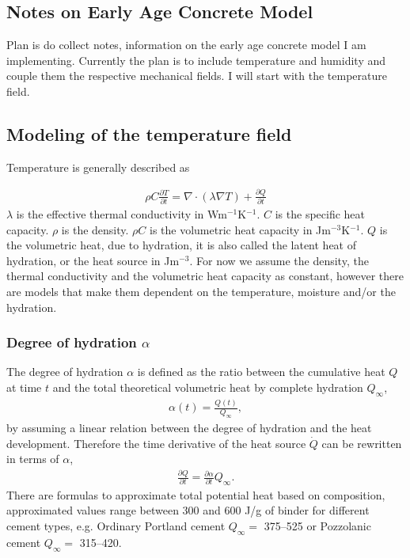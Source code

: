 
\subsection{Notes on Early Age Concrete Model}
Plan is do collect notes, information on the early age concrete model I am implementing.
Currently the plan is to include temperature and humidity and couple them the respective mechanical fields.
I will start with the temperature field.

\subsection{Modeling of the temperature field}
Temperature is generally described as

\begin{align}
	\rho C\frac{\partial T}{\partial t} = \nabla \cdot (\lambda \nabla T) + \frac{\partial Q}{\partial t} \label{eq:heat1}
\end{align}
$\lambda$ is the effective thermal conductivity in Wm$^{-1}$K$^{-1}$.
$C$ is the specific heat capacity.
$\rho$ is the density.
$\rho C$ is the volumetric heat capacity in Jm$^{-3}$K$^{-1}$.
$Q$ is the volumetric heat, due to hydration, it is also called the latent heat of hydration, or the heat source in Jm$^{-3}$.
For now we assume the density, the thermal conductivity and the volumetric heat capacity as constant, however there are models that make them dependent on the temperature, moisture and/or the hydration.


\subsubsection{Degree of hydration $\alpha$}
The degree of hydration $\alpha$ is defined as the ratio between the cumulative heat $Q$ at time $t$ and the total theoretical volumetric heat by complete hydration $Q_{\infty}$,
\begin{align}
	\alpha(t) = \frac{Q(t)}{Q_{\infty}},
\end{align}
by assuming a linear relation between the degree of hydration and the heat development.
Therefore the time derivative of the heat source $\dot{Q}$ can be rewritten in terms of $\alpha$, 
\begin{align}
	\frac{\partial Q}{\partial t} = \frac{\partial \alpha}{\partial t} Q_{\infty}. \label{eq:qdotalphadot}
\end{align}
There are formulas to approximate total potential heat based on composition, approximated values range between 300 and 600 J/g of binder for different cement types, e.g. Ordinary Portland cement $Q_{\infty} =$ 375–525 or Pozzolanic cement $Q_{\infty} =$ 315–420.  

